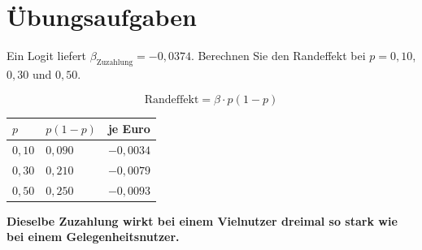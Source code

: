 \section{Übungsaufgaben}

\begin{aufgabe}
Ein Logit liefert $\beta_{\text{Zuzahlung}} = -0{,}0374$. Berechnen Sie den Randeffekt bei $p = 0{,}10$, $0{,}30$ und $0{,}50$.

\loesung
{}
\[ \text{Randeffekt} = \beta\cdot p(1-p) \]

\begin{center}
{\small
\renewcommand{\arraystretch}{1.48}
\begin{tabular}{@{}P{1.6cm}P{2.2cm}P{2.6cm}@{}}
\toprule
$p$ & $p(1-p)$ & \textbf{je Euro}\\
\midrule
$0{,}10$ & $0{,}090$ & $-0{,}0034$\\
$0{,}30$ & $0{,}210$ & $-0{,}0079$\\
$0{,}50$ & $0{,}250$ & $-0{,}0093$\\
\bottomrule
\end{tabular}}
\end{center}

\begin{center}
\begin{minipage}{0.9\textwidth}
\textbf{Dieselbe Zuzahlung wirkt bei einem Vielnutzer dreimal so stark wie bei einem Gelegenheitsnutzer.}
\end{minipage}
\end{center}

\begin{center}
\begin{minipage}{0.88\textwidth}
\end{minipage}
\end{center}
\end{aufgabe}

